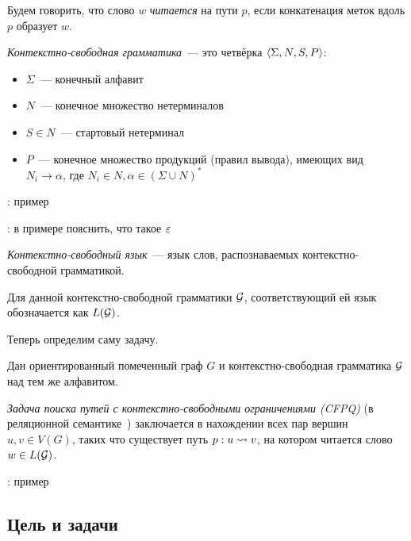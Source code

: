 \begin{definition}
Будем говорить, что слово $w$ \textit{читается} на пути $p$, если конкатенация меток вдоль $p$ образует $w$. 
\end{definition}

\begin{definition}
\textit{Контекстно-свободная грамматика}~--- это четвёрка $\langle \Sigma, N, S, P \rangle$:
\begin{itemize}
  \setlength\itemsep{-0.1em}
  \item $\Sigma$~--- конечный алфавит
  \item $N$~--- конечное множество нетерминалов
  \item $S \in N$~--- стартовый нетерминал
  \item $P$~--- конечное множество продукций (правил вывода), имеющих вид\\ $N_i \to \alpha$, где $N_i \in N, \alpha \in (\Sigma \cup N)^{*}$
\end{itemize}
\end{definition}

\TODO: пример

\TODO: в примере пояснить, что такое $\varepsilon$

\begin{definition}
\textit{Контекстно-свободный язык}~--- язык слов, распознаваемых контекстно-свободной грамматикой.

Для данной контекстно-свободной грамматики $\mathcal{G}$, соответствующий ей язык обозначается как $L(\mathcal{G})$. 
\end{definition}

Теперь определим саму задачу.

\begin{definition}
  Дан ориентированный помеченный граф $G$ и контекстно-свободная грамматика $\mathcal{G}$ над тем же алфавитом.

  \textit{Задача поиска путей с контекстно-свободными ограничениями (CFPQ)} (в реляционной семантике~\cite{Hellings16}) заключается в нахождении всех пар вершин $u, v \in V(G)$, таких что существует путь $p: u \rightsquigarrow v$, на котором читается слово $w \in L(\mathcal{G})$.

\end{definition}

\TODO: пример


\subsection*{Цель и задачи}

